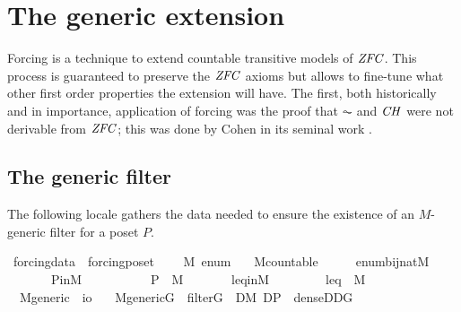 \section{The generic extension}
Forcing is a technique to extend countable transitive models of
$\mathit{ZFC}$. This process is guaranteed to preserve the $\mathit{ZFC}$
axioms but allows to fine-tune what other first order properties the
extension will have. The first, both historically and in importance,
application of forcing was the proof that $\AC$ and $\mathit{CH}$ were not
derivable from $\mathit{ZFC}$; this was done by Cohen in its seminal work
\cite{Cohen-CH-PNAS}.

\subsection{The generic filter}
The following locale gathers the data needed to ensure the 
existence of an $M$-generic filter for a poset $P$.

\begin{isabellebody}
\isanewline
{}\isamarkupfalse%
\ forcing{\isacharunderscore}data\ {\isacharequal}\ forcing{\isacharunderscore}poset\ {\isacharplus}\isanewline
\ \ \ M\ enum\isanewline
\ \ \ M{\isacharunderscore}countable{\isacharcolon}\ \ \ \ \ \ {\isachardoublequoteopen}enum{\isasymin}bij{\isacharparenleft}nat{\isacharcomma}M{\isacharparenright}{\isachardoublequoteclose}\isanewline
\ \ \ \ \ \ \ P{\isacharunderscore}in{\isacharunderscore}M{\isacharcolon}\ \ \ \ \ \ \ \ \ \ \ {\isachardoublequoteopen}P\ {\isasymin}\ M{\isachardoublequoteclose}\isanewline
\ \ \ \ \ \ \ leq{\isacharunderscore}in{\isacharunderscore}M{\isacharcolon}\ \ \ \ \ \ \ \ \ {\isachardoublequoteopen}leq\ {\isasymin}\ M{\isachardoublequoteclose}\isanewline
\isanewline
{}\ \ \isanewline
{}\isamarkupfalse%
\isanewline
\ \ M{\isacharunderscore}generic\ {\isacharcolon}{\isacharcolon}\ {\isachardoublequoteopen}i{\isasymRightarrow}o{\isachardoublequoteclose}\ \isanewline
\ \ {\isachardoublequoteopen}M{\isacharunderscore}generic{\isacharparenleft}G{\isacharparenright}\ {\isacharequal}{\isacharequal}\ filter{\isacharparenleft}G{\isacharparenright}\ {\isasymand}\ {\isacharparenleft}{\isasymforall}D{\isasymin}M{\isachardot}\ D{\isasymsubseteq}P\ {\isasymand}\ dense{\isacharparenleft}D{\isacharparenright}{\isasymlongrightarrow}D{\isasyminter}G{\isasymnoteq}{}{\isacharparenright}{\isachardoublequoteclose}\isanewline
\end{isabellebody}

